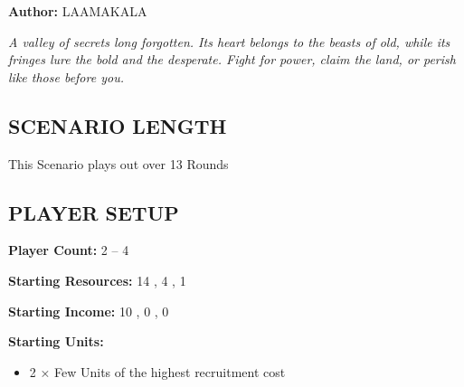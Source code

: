 
\begin{multicols*}{2}

\textbf{Author:} LAAMAKALA


\textit{A valley of secrets long forgotten. Its heart belongs to the beasts of old, while its fringes lure the bold and the desperate. Fight for power, claim the land, or perish like those before you.}


\subsection*{\MakeUppercase{Scenario Length}}
This Scenario plays out over 13 Rounds 

\subsection*{\MakeUppercase{Player Setup}}
\textbf{Player Count:} 2 -- 4

\textbf{Starting Resources:} 14 , 4 , 1 

\textbf{Starting Income:} 10 , 0 , 0 

\textbf{Starting Units:}
\begin{itemize}
  \item 2 × Few  Units of the highest recruitment cost
\end{itemize}


\end{multicols*}
